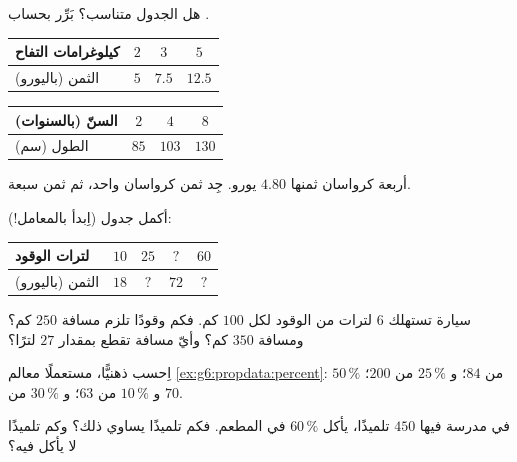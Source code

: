 \begin{exercise}[$\star$]\label{exo:g6:propdata:1}
هل الجدول متناسب؟ بَرِّر بحساب .
\begin{center}
\renewcommand{\arraystretch}{1.2}
\begin{tabular}{l|ccc}
كيلوغرامات التفاح & $2$ & $3$ & $5$ \\
\hline
الثمن (باليورو) & $5$ & $7.5$ & $12.5$ \\
\end{tabular}
\qquad
\begin{tabular}{l|ccc}
السنّ (بالسنوات) & $2$ & $4$ & $8$ \\
\hline
الطول (سم) & $85$ & $103$ & $130$ \\
\end{tabular}
\end{center}
\end{exercise}

\begin{exercise}[$\star$]\label{exo:g6:propdata:2}
أربعة كرواسان ثمنها $4.80$ يورو. جِد ثمن كرواسان واحد،
ثم ثمن سبعة.
\end{exercise}

\begin{exercise}[$\star$]\label{exo:g6:propdata:3}
أكمل جدول  (اِبدأ بالمعامل!):
\begin{center}
\renewcommand{\arraystretch}{1.2}
\begin{tabular}{l|cccc}
لترات الوقود & $10$ & $25$ & $?$ & $60$ \\
\hline
الثمن (باليورو) & $18$ & $?$ & $72$ & $?$ \\
\end{tabular}
\end{center}
\end{exercise}

\begin{exercise}[$\star$]\label{exo:g6:propdata:4}
سيارة تستهلك $6$ لترات من الوقود لكل $100$ كم. فكم وقودًا تلزم مسافة $250$ كم؟ ومسافة
$350$ كم؟ وأيّ مسافة تقطع بمقدار $27$ لترًا؟
\end{exercise}

\begin{exercise}[$\star$]\label{exo:g6:propdata:5}
اِحسب ذهنيًّا، مستعملًا معالم \cref{ex:g6:propdata:percent}:
$50\,\%$ من $84$؛ \quad و $25\,\%$ من $200$؛ \quad و $10\,\%$ من $63$؛
\quad و $30\,\%$ من $70$.
\end{exercise}

\begin{exercise}[$\star$]\label{exo:g6:propdata:6}
في مدرسة فيها $450$ تلميذًا، يأكل $60\,\%$ في المطعم. فكم
تلميذًا يساوي ذلك؟ وكم تلميذًا لا يأكل فيه؟
\end{exercise}

